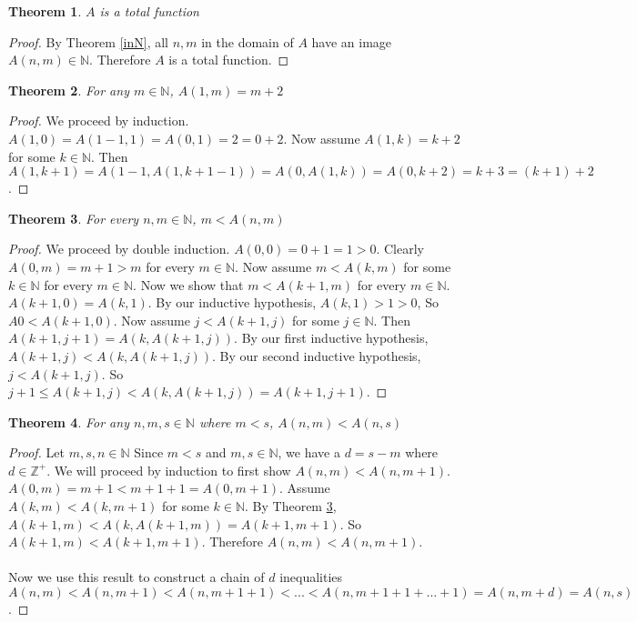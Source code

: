 \documentclass[12pt, letterpaper]{article}
\newtheorem{theorem}{Theorem}
\theoremstyle{case}
\begin{document}
    \begin{theorem}
      $A$ is a total function
    \end{theorem}
    \begin{proof}
      By Theorem \ref{inN}, all $n, m$ in the domain of $A$ have an image $A(n, m) \in \mathbb{N}$.
      Therefore $A$ is a total function.
    \end{proof}

    \begin{theorem}
      \label{x+2=A(1,x)}
      For any $m \in \mathbb{N}$, $A(1, m) = m + 2$
    \end{theorem}
    \begin{proof}
      We proceed by induction. \\
      $A(1, 0) = A(1 - 1, 1) = A(0, 1) = 2 = 0 + 2$. Now assume $A(1, k) = k + 2$ for some $k \in \mathbb{N}$.
      Then $A(1, k + 1) = A(1 - 1, A(1, k + 1 - 1)) = A(0, A(1, k)) = A(0, k + 2) = k + 3 = (k + 1) + 2$.
    \end{proof}

    \begin{theorem}
      \label{m<A(n,m)}
      For every $n, m \in \mathbb{N}$, $m < A(n, m)$
    \end{theorem}
    \begin{proof}
      We proceed by double induction.
      $A(0, 0) = 0 + 1 = 1 > 0$.
      Clearly $A(0, m) = m + 1 > m$ for every $m \in \mathbb{N}$.
      Now assume $m < A(k, m)$ for some $k \in \mathbb{N}$ for every $m \in \mathbb{N}$.
      Now we show that $m < A(k + 1, m)$ for every $m \in \mathbb{N}$.
      $A(k + 1, 0) = A(k, 1)$. By our inductive hypothesis, $A(k, 1) > 1 > 0$,
      So $A0 < A(k + 1, 0)$.
      Now assume $j < A(k + 1, j)$ for some $j \in \mathbb{N}$.
      Then $A(k + 1, j + 1) = A(k, A(k + 1, j))$.
      By our first inductive hypothesis, $A(k + 1, j) < A(k, A(k + 1, j))$.
      By our second inductive hypothesis, $j < A(k + 1, j)$.
      So $j + 1 \leq A(k + 1, j) < A(k, A(k + 1, j)) = A(k + 1, j + 1)$.
    \end{proof}

    \begin{theorem}
      \label{a(n,m)<a(n,s)}
      For any $n, m, s \in \mathbb{N}$ where $m < s$, $A(n, m) < A(n, s)$
    \end{theorem}
    \begin{proof}
      Let $m, s, n \in \mathbb{N}$
      Since $m < s$ and $m, s \in \mathbb{N}$, we have a $d = s - m$ where $d \in \mathbb{Z}^+$.
      We will proceed by induction to first show $A(n, m) < A(n, m + 1)$.
      $A(0, m) = m + 1 < m + 1 + 1 = A(0, m + 1)$.
      Assume $A(k, m) < A(k, m + 1)$ for some $k \in \mathbb{N}$.
      By Theorem \ref{m<A(n,m)}, $A(k + 1, m) < A(k, A(k + 1, m)) = A(k + 1, m + 1)$.
      So $A(k + 1, m) < A(k + 1, m + 1)$.
      Therefore $A(n, m) < A(n, m + 1)$.
      \\
      \\
      Now we use this result to construct a chain of $d$ inequalities $A(n, m) < A(n, m + 1) < A(n, m + 1 + 1) < ... < A(n, m + 1 + 1 + ... + 1)
      = A(n, m + d) = A(n, s)$. 
    \end{proof}
\end{document}
